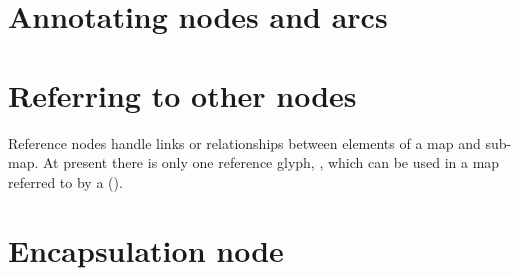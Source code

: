 \section{Annotating nodes and arcs}



\section{Referring to other nodes}
\label{sec:ref_nodes}

Reference nodes handle links or relationships between elements of a map and sub-map.
At present there is only one reference glyph, , which can be used in a map referred to by a  ().




\section{Encapsulation node}
\label{sec:encapsulation}


